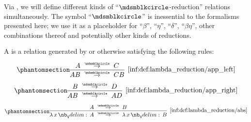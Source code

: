 \begin{definition}\label{def:lambda_reduction}
  Via , we will define different kinds of \enquote{\( {\Anon} \)-reduction} relations simultaneously. The symbol \enquote{\( {\Anon} \)} is inessential to the formalisms presented here; we use it as a placeholder for \enquote{\( \beta \)}, \enquote{\( \eta \)}, \enquote{\( \delta \)}, \enquote{\( \beta\eta \)}, other combinations thereof and potentially other kinds of reductions.

  \begin{thmenum}
     A  is a relation generated by or otherwise satisfying the following rules:
    \begin{paracol}{3}
      \begin{nthcolumn}{0}
        \begin{equation*}\taglabel[\ensuremath{ \logic{App}_{\Anon}^L }]{inf:def:lambda_reduction/app_left}
          \begin{prooftree}
            \hypo{ A \pred C }
            \infer1[\ref{inf:def:lambda_reduction/app_left}]{ AB \pred CB }
          \end{prooftree}
        \end{equation*}
      \end{nthcolumn}

      \begin{nthcolumn}{1}
        \begin{equation*}\taglabel[\ensuremath{ \logic{App}_{\Anon}^R }]{inf:def:lambda_reduction/app_right}
          \begin{prooftree}
            \hypo{ B \pred D }
            \infer1[\ref{inf:def:lambda_reduction/app_right}]{ AB \pred AD }
          \end{prooftree}
        \end{equation*}
      \end{nthcolumn}

      \begin{nthcolumn}{2}
        \begin{equation*}\taglabel[\ensuremath{ \logic{Abs}_{\Anon} }]{inf:def:lambda_reduction/abs}
          \begin{prooftree}
            \hypo{ A \pred B }
            \infer1[\ref{inf:def:lambda_reduction/abs}]{ \qabs x A \pred \qabs x B }
          \end{prooftree}
        \end{equation*}
      \end{nthcolumn}
    \end{paracol}


\end{thmenum}
\end{definition}
